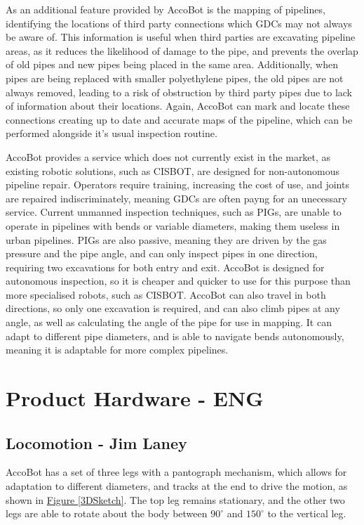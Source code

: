\documentclass[11pt]{article}		%
\newcommand{\figref}[1]{\hyperref[#1]{Figure \ref*{#1}}}    %
\begin{document}
		As an additional feature provided by AccoBot is the mapping of pipelines, identifying the locations of third party connections which GDCs may not always be aware of.
		This information is useful when third parties are excavating pipeline areas, as it reduces the likelihood of damage to the pipe, and prevents the overlap of old pipes and new pipes being placed in the same area.
		Additionally, when pipes are being replaced with smaller polyethylene pipes, the old pipes are not always removed, leading to a risk of obstruction by third party pipes due to lack of information about their locations.
		Again, AccoBot can mark and locate these connections creating up to date and accurate maps of the pipeline, which can be performed alongside it's usual inspection routine.
		
		AccoBot provides a service which does not currently exist in the market, as existing robotic solutions, such as CISBOT, are designed for non-autonomous pipeline repair.
		Operators require training, increasing the cost of use, and joints are repaired indiscriminately, meaning GDCs are often payng for an unecessary service.
		Current unmanned inspection techniques, such as PIGs, are unable to operate in pipelines with bends or variable diameters, making them useless in urban pipelines.
		PIGs are also passive, meaning they are driven by the gas pressure and the pipe angle, and can only inspect pipes in one direction, requiring two excavations for both entry and exit.
		AccoBot is designed for autonomous inspection, so it is cheaper and quicker to use for this purpose than more specialised robots, such as CISBOT.
		AccoBot can also travel in both directions, so only one excavation is required, and can also climb pipes at any angle, as well as calculating the angle of the pipe for use in mapping.
		It can adapt to different pipe diameters, and is able to navigate bends autonomously, meaning it is adaptable for more complex pipelines.
				
		\section{Product Hardware - ENG}
	
		\subsection[Locomotion]{Locomotion - Jim Laney} \label{Lomcotion}
		
			AccoBot has a set of three legs with a pantograph mechanism, which allows for adaptation to different diameters, and tracks at the end to drive the motion, as shown in \figref{3DSketch}.
			The top leg remains stationary, and the other two legs are able to rotate about the body between $90^\circ$ and $150^\circ$ to the vertical leg.
			
\end{document}

